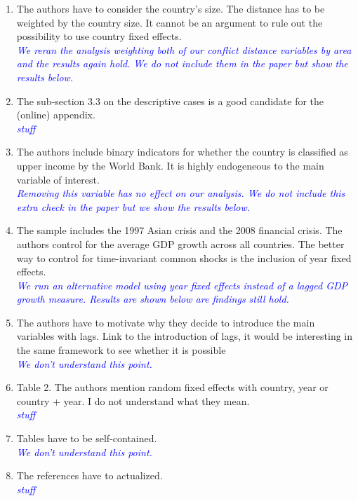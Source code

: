 \begin{enumerate}
\item The authors have to consider the country’s size. The distance has to be weighted by the country size. It cannot be an argument to rule out the possibility to use country fixed effects. \\

\textcolor{blue}{\emph{
	We reran the analysis weighting both of our conflict distance variables by area and the results again hold. We do not include them in the paper but show the results below. 
}}

\item The sub-section 3.3 on the descriptive cases is a good candidate for the (online) appendix. \\

\textcolor{blue}{\emph{
	stuff
}}

\item  The authors include binary indicators for whether the country is classified as upper income by the World Bank. It is highly endogeneous to the main variable of interest. \\

\textcolor{blue}{\emph{
	Removing this variable has no effect on our analysis. We do not include this extra check in the paper but we show the results below.
}}

\item The sample includes the 1997 Asian crisis and the 2008 financial crisis. The authors control for the average GDP growth across all countries. The better way to control for time-invariant common shocks is the inclusion of year fixed effects. \\

\textcolor{blue}{\emph{
	We run an alternative model using year fixed effects instead of a lagged GDP growth measure. Results are shown below are findings still hold.
}}

\item The authors have to motivate why they decide to introduce the main variables with lags. Link to the introduction of lags, it would be interesting in the same framework to see whether it is possible \\

\textcolor{blue}{\emph{
	We don't understand this point.
}}

\item Table 2. The authors mention random fixed effects with country, year or country + year. I do not understand what they mean. \\

\textcolor{blue}{\emph{
	stuff
}}

\item Tables have to be self-contained. \\

\textcolor{blue}{\emph{
	We don't understand this point.
}}

\item The references have to actualized. \\

\textcolor{blue}{\emph{
	stuff
}}

\end{enumerate}